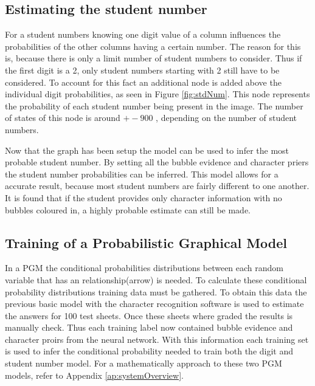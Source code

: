 
\subsection{Estimating the student number}
\label{sec:studentNumber}

For a student numbers knowing one digit value of a column influences the probabilities of the other columns having a certain number. The reason for this is, because there is only a limit number of student numbers to consider. Thus if the first digit is a 2, only student numbers starting with 2 still have to be considered. To account for this fact an additional node is added above the individual digit probabilities, as seen in Figure \ref{fig:stdNum}. This node represents the probability of each student number being present in the image. The number of states of this node is around $+- 900$ , depending on the number of student numbers.

Now that the graph has been setup the model can be used to infer the most probable student number. By setting all the bubble evidence and character priers the student number probabilities can be inferred. This model allows for a accurate result, because most student numbers are fairly different to one another. It is found that if the student provides only character information with no bubbles coloured in, a highly probable estimate can still be made.

\subsection{Training of a Probabilistic Graphical Model}
In a PGM the conditional probabilities distributions between each random variable that has an relationship(arrow) is needed. 
To calculate these conditional probability distributions training data must be gathered. To obtain this  data the previous basic model with the character recognition software is used to estimate the answers for 100 test sheets. Once these sheets where graded the results is manually check. Thus each training label now contained bubble evidence and character proirs from the neural network. With this information each training set is used to infer the conditional probability needed to train both the digit and student number model. For a mathematically approach to these two PGM models, refer to Appendix \ref{ap:systemOverview}.

